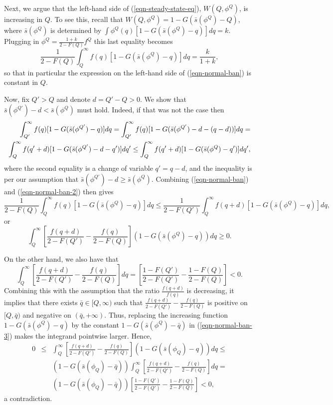 \documentclass[12pt]{article}
\theoremstyle{plain}
\theoremstyle{definition}
\theoremstyle{remark}
\begin{document}
    Next, we argue that the left-hand side of (\ref{eqn-steady-state-eq}), $W(Q,\phi^Q)$, is increasing in $Q$. To see this, recall that $W(Q,\phi^Q)=1-G(\bar s(\phi^Q)-Q)$, where $\bar s(\phi^Q)$ is determined by $\int \phi^Q(q)[1-G(\bar s(\phi^Q)-q)]dq=k$. Plugging in $\phi^Q=\frac{1+k}{2-F(Q)}f^Q$ this last equality becomes
    \begin{equation}\label{eqn-normal-ban}
        \frac{1}{2-F(Q)} \int_Q^\infty f(q)  [1-G(\bar s(\phi^Q)-q)] dq = \frac{k}{1+k},
    \end{equation}
    so that in particular the expression on the left-hand side of (\ref{eqn-normal-ban}) is constant in $Q$. 
    
    Now, fix $Q'>Q$ and denote $d=Q'-Q>0$. We show that $\bar s(\phi^{Q'})-d < \bar s(\phi^{Q})$ must hold. Indeed, if that was not the case then  
    \begin{eqnarray}\label{eqn-normal-ban-2}
       \int_{Q'}^\infty f(q)  [1-G(\bar s(\phi^{Q'})-q)] dq = \int_{Q'}^\infty f(q)  [1-G(\bar s(\phi^{Q'})-d-(q-d))] dq = \notag\\
        \int_{Q}^\infty f(q'+d)  [1-G(\bar s(\phi^{Q'})-d-q')] dq' \le \int_{Q}^\infty f(q'+d)  [1-G(\bar s(\phi^Q)-q')] dq', 
    \end{eqnarray}
    where the second equality is a change of variable $q'=q-d$, and the inequality is per our assumption that $\bar s(\phi^{Q'})-d \ge \bar s(\phi^{Q})$. Combining (\ref{eqn-normal-ban}) and (\ref{eqn-normal-ban-2}) then gives
        $$\frac{1}{2-F(Q)} \int_Q^\infty f(q)  [1-G(\bar s(\phi^Q)-q)] dq \le  \frac{1}{2-F(Q')} \int_{Q}^\infty f(q+d)  [1-G(\bar s(\phi^{Q})-q)] dq,$$
    or
    \begin{equation}\label{eqn-normal-ban-3}
    \int_Q^\infty \left[\frac{f(q+d)}{2-F(Q')} - \frac{f(q)}{2-F(Q)} \right](1-G(\bar s(\phi^Q)-q)) dq \ge 0.
     \end{equation}

    On the other hand, we also have that 
    $$\int_Q^\infty \left[\frac{f(q+d)}{2-F(Q')} - \frac{f(q)}{2-F(Q)} \right]dq = \left[ \frac{1-F(Q')}{2-F(Q')} -  \frac{1-F(Q)}{2-F(Q)} \right] <0.$$
    Combining this with the assumption that the ratio $\frac{f(q+d)}{f(q)}$ is decreasing, it implies that there exists $\bar q\in [Q,\infty)$ such that $\frac{f(q+d)}{2-F(Q')} - \frac{f(q)}{2-F(Q)}$ is positive on $[Q,\bar q)$ and negative on $(\bar q, +\infty)$. Thus, replacing the increasing function $1-G(\bar s(\phi^Q)-q)$ by the constant $1-G(\bar s(\phi^Q)-\bar q)$ in (\ref{eqn-normal-ban-3}) makes the integrand pointwise larger. Hence,
    \begin{eqnarray*}
        0 &\le& \int_Q^\infty \left[\frac{f(q+d)}{2-F(Q')} - \frac{f(q)}{2-F(Q)} \right](1-G(\bar s(\phi_Q)-q)) dq \le \\
        & & (1-G(\bar s(\phi_Q)-\bar q)) \int_Q^\infty \left[\frac{f(q+d)}{2-F(Q')} - \frac{f(q)}{2-F(Q)} \right] dq =\\ 
        & & (1-G(\bar s(\phi_Q)-\bar q)) \left[ \frac{1-F(Q')}{2-F(Q')} -  \frac{1-F(Q)}{2-F(Q)} \right] <0,
    \end{eqnarray*}
    a contradiction. 
    
\end{document}
